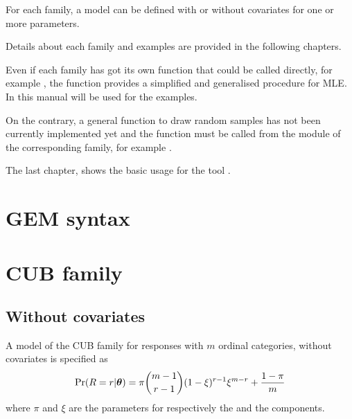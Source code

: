 \documentclass[letterpaper,10pt,english]{sphinxmanual}
\begin{document}
\sphinxAtStartPar
For each family, a model can be defined with or without covariates for one or more parameters.

\sphinxAtStartPar
Details about each family and examples are provided in the following chapters.

\sphinxAtStartPar
Even if each family has got its own  function  that
could be called directly, for example , the function  provides a
simplified and generalised procedure for MLE. In this manual  will be used for the examples.

\sphinxAtStartPar
On the contrary, a general function to draw random samples has not been currently
implemented yet and the function must be called from the module of the corresponding family,
for example .

\sphinxAtStartPar
The last chapter, shows the basic usage for the tool .


\section{GEM syntax}
\label{\detokenize{manual:gem-syntax}}

\section{CUB family}
\label{\detokenize{manual:cub-family}}

\subsection{Without covariates}
\label{\detokenize{manual:without-covariates}}
\sphinxAtStartPar
A model of the CUB family for responses with \(m\) ordinal categories, without covariates is specified as
\begin{equation*}
\begin{split}\Pr(R=r|\boldsymbol{\theta}) = \pi \dbinom{m-1}{r-1}(1-\xi)^{r-1}\xi^{m-r}+\dfrac{1-\pi}{m}\end{split}
\end{equation*}
\sphinxAtStartPar
where \(\pi\) and \(\xi\) are the parameters for respectively the  and the
 components.
\end{document}
